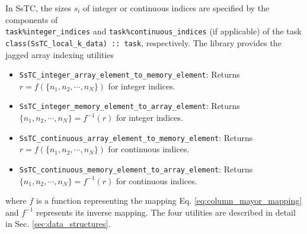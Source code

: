 \documentclass[10pt,a4paper]{article}
\begin{document}
In SsTC, the sizes $s_i$ of integer or continuous indices are specified by the components of \\ \verb|task%integer_indices| and \verb|task%continuous_indices| (if applicable) of the task \\ \verb|class(SsTC_local_k_data) :: task|, respectively. The library provides the jagged array indexing utilities
\begin{tcolorbox}
\begin{itemize}
\item \verb|SsTC_integer_array_element_to_memory_element|: Returns $r = f(\{n_1, n_2, \cdots, n_N\})$ for integer indices.
\item \verb|SsTC_integer_memory_element_to_array_element|: Returns $\{n_1, n_2, \cdots, n_N\} = f^{-1}(r)$ for integer indices.
\item \verb|SsTC_continuous_array_element_to_memory_element|: Returns $r = f(\{n_1, n_2, \cdots, n_N\})$ for continuous indices.
\item \verb|SsTC_continuous_memory_element_to_array_element|: Returns $\{n_1, n_2, \cdots, n_N\} = f^{-1}(r)$ for continuous indices.
\end{itemize}
\end{tcolorbox}
where $f$ is a function representing the mapping Eq. \eqref{eq:column_mayor_mapping} and $f^{-1}$ represents its inverse mapping. The four utilities are described in detail in Sec. \ref{sec:data_structures}.
\end{document}
